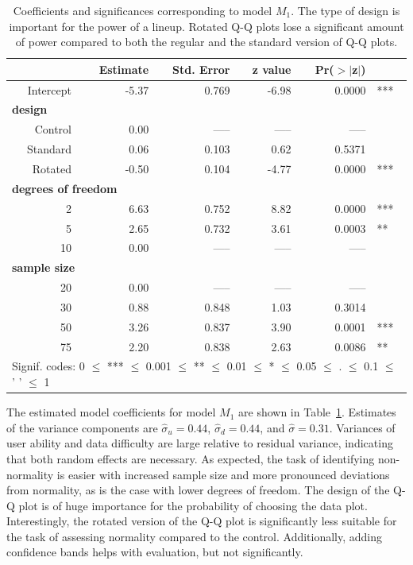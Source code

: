\documentclass{article}\usepackage[]{graphicx}\usepackage[]{color}
\begin{document}
\begin{table}[ht]
\centering
\caption{\label{tab:model} Coefficients and significances corresponding to  model $M_1$. The type of design is important for the power of a lineup. Rotated Q-Q plots lose a significant amount of power compared to both the regular and the standard version of Q-Q plots. }
\begin{tabular}{rrrrrl}
  \hline
 &\bf Estimate &\bf Std. Error &\bf z value &\bf Pr($>$$|$z$|$) & \\ 
  \hline
  Intercept &  -5.37 & 0.769 & -6.98 & 0.0000  & *** \\ [3pt]
\multicolumn{3}{l}{\bf design} \\
   Control & 0.00 & ----- & ----- & ----- \\ 
   Standard & 0.06 & 0.103 & 0.62 & 0.5371 \\
   Rotated & -0.50 & 0.104 & -4.77 & 0.0000 & ***\\  [3pt]
\multicolumn{4}{l}{\bf degrees of freedom} \\
  2 & 6.63 & 0.752 & 8.82 & 0.0000 & ***\\ 
  5 & 2.65 & 0.732 & 3.61 & 0.0003 & **\\ 
  10 & 0.00 & ----- & ----- & ----- \\ [3pt]
\multicolumn{3}{l}{\bf sample size} \\
  20 & 0.00 & ----- & ----- & ----- \\ 
  30 & 0.88 & 0.848 & 1.03 & 0.3014 \\ 
  50  & 3.26 & 0.837 & 3.90 & 0.0001 & ***\\ 
  75 & 2.20 & 0.838 & 2.63 & 0.0086  & **\\ 
   \hline
\multicolumn{6}{l}{Signif. codes:  0 $\le$ *** $\le$ 0.001 $\le$ ** $\le$ 0.01 $\le$ * $\le$ 0.05 $\le$ . $\le$ 0.1 $\le$ ' ' $\le$ 1}
\end{tabular}
\end{table}

The estimated model coefficients for model $M_1$ are shown in Table~\ref{tab:model}. 
Estimates of the variance components are $\widehat{\sigma}_u = 0.44$, $\widehat{\sigma}_d=0.44$, and $\widehat{\sigma} = 0.31$. Variances of user ability and data difficulty are large relative to residual variance, indicating that both random effects are necessary.
%
As expected, the task of identifying non-normality is easier with increased sample size and more pronounced deviations from normality, as is the case with lower degrees of freedom. The  design of the Q-Q plot is of huge importance for the probability of choosing the data plot. Interestingly, the rotated version of the Q-Q plot is significantly less suitable for the task of assessing normality compared to the control. Additionally, adding confidence bands helps with evaluation, but not significantly. 
\end{document}
